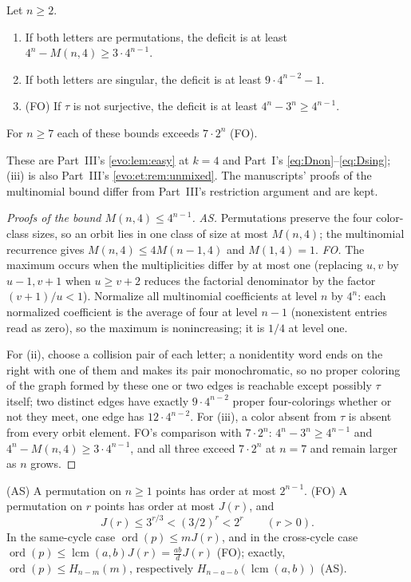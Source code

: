\documentclass[11pt,a4paper]{article}
\numberwithin{equation}{section}
\theoremstyle{definition}
\theoremstyle{remark}
\newcommand{\ord}{\operatorname{ord}}
\newcommand{\lcm}{\operatorname{lcm}}
\begin{document}
\begin{lemma}\label{fo:lem:easy}
Let $n\ge2$.
\begin{enumerate}[label=(\roman*)]
\item If both letters are permutations, the deficit is at least
$4^n-M(n,4)\ge3\cdot4^{n-1}$.
\item If both letters are singular, the deficit is at least $9\cdot4^{n-2}-1$.
\item \textup{(FO)} If $\tau$ is not surjective, the deficit is at least
$4^n-3^n\ge4^{n-1}$.
\end{enumerate}
For $n\ge7$ each of these bounds exceeds $7\cdot2^n$ \textup{(FO)}.
\end{lemma}

These are Part~III's \cref{evo:lem:easy} at $k=4$ and Part~I's
\eqref{eq:Dnon}--\eqref{eq:Dsing}; (iii) is also Part~III's
\cref{evo:et:rem:unmixed}. The manuscripts' proofs of the multinomial bound
differ from Part~III's restriction argument and are kept.

\begin{proof}[Proofs of the bound $M(n,4)\le4^{n-1}$]
\emph{AS.} Permutations preserve the four color-class sizes, so an orbit lies
in one class of size at most $M(n,4)$; the multinomial recurrence gives
$M(n,4)\le4M(n-1,4)$ and $M(1,4)=1$. \emph{FO.} The maximum occurs when the
multiplicities differ by at most one (replacing $u,v$ by $u-1,v+1$ when
$u\ge v+2$ reduces the factorial denominator by the factor $(v+1)/u<1$).
Normalize all multinomial coefficients at level $n$ by $4^n$: each
normalized coefficient is the average of four at level $n-1$ (nonexistent
entries read as zero), so the maximum is nonincreasing; it is $1/4$ at level
one.

For (ii), choose a collision pair of each letter; a nonidentity word ends on
the right with one of them and makes its pair monochromatic, so no proper
coloring of the graph formed by these one or two edges is reachable except
possibly $\tau$ itself; two distinct edges have exactly $9\cdot4^{n-2}$ proper
four-colorings whether or not they meet, one edge has $12\cdot4^{n-2}$.
For (iii), a color absent from $\tau$ is absent from every orbit element.
FO's comparison with $7\cdot2^n$: $4^n-3^n\ge4^{n-1}$ and
$4^n-M(n,4)\ge3\cdot4^{n-1}$, and all three exceed $7\cdot2^n$ at $n=7$ and
remain larger as $n$ grows.
\end{proof}

\begin{lemma}\label{fo:lem:order}
\textup{(AS)} A permutation on $n\ge1$ points has order at most $2^{n-1}$.
\textup{(FO)} A permutation on $r$ points has order at most $J(r)$, and
\begin{equation}\label{fo:eq:period}
 J(r)\le3^{r/3}<(3/2)^r<2^r\qquad(r>0).
\end{equation}
In the same-cycle case $\ord(p)\le mJ(r)$, and in the cross-cycle case
$\ord(p)\le\lcm(a,b)J(r)=\tfrac{ab}{d}J(r)$ \textup{(FO)}; exactly,
$\ord(p)\le H_{n-m}(m)$, respectively $H_{n-a-b}(\lcm(a,b))$ \textup{(AS)}.
\end{lemma}
\end{document}
